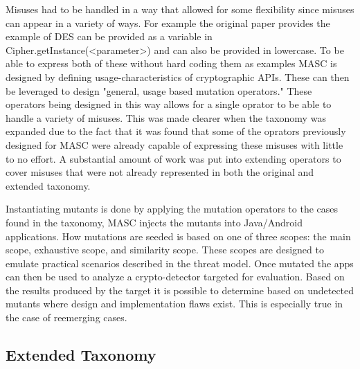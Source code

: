 Misuses had to be handled in a way that allowed for some flexibility since misuses can appear in a variety of ways. For example the original paper provides the example of DES can be provided as a variable in Cipher.getInstance(<parameter>) and can also be provided in lowercase. To be able to express both of these without hard coding them as examples MASC is designed by defining usage-characteristics of cryptographic APIs. These can then be leveraged to design "general, usage based mutation operators." These operators being designed in this way allows for a single oprator to be able to handle a variety of misuses. This was made clearer when the taxonomy was expanded due to the fact that it was found that some of the oprators previously designed for MASC were already capable of expressing these misuses with little to no effort. A substantial amount of work was put into extending operators to cover misuses that were not already represented in both the original and extended taxonomy.

Instantiating mutants is done by applying the mutation operators to the cases found in the taxonomy, MASC injects the mutants into Java/Android applications. How mutations are seeded is based on one of three scopes: the main scope, exhaustive scope, and similarity scope. These scopes are designed to emulate practical scenarios described in the threat model. Once mutated the apps can then be used to analyze a crypto-detector targeted for evaluation. Based on the results produced by the target it is possible to determine based on undetected mutants where design and implementation flaws exist. This is especially true in the case of reemerging cases.

\subsection{Extended Taxonomy}
\label{ch2:sec:taxonomy}

